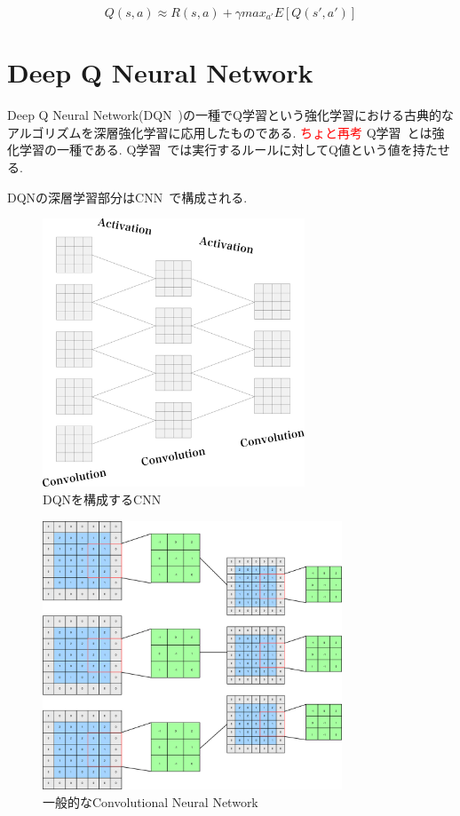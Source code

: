 \begin{equation}
    Q(s, a) \approx R(s, a) + \gamma max_{a'} E[Q(s', a')]
\end{equation}

\section{Deep Q Neural Network}

Deep Q Neural Network(DQN~\cite{DQN})の一種でQ学習という強化学習における古典的なアルゴリズムを深層強化学習に応用したものである.
\textcolor{red}{ちょと再考}
Q学習~\cite{QL}とは強化学習の一種である. Q学習~\cite{QL}では実行するルールに対してQ値という値を持たせる.

DQNの深層学習部分はCNN~\cite{DQN}で構成される.

\begin{figure}[H]
    \centering
    \includegraphics[clip,height = 8.0cm]{assets/dqn_convolution.eps}
    \caption{DQNを構成するCNN}  \label{sample}
\end{figure}




\begin{figure}[H]
    \centering
    \includegraphics[clip,height = 8.0cm]{assets/CNN_typical.eps}
    \caption{一般的なConvolutional Neural Network}  \label{sample}
\end{figure}



